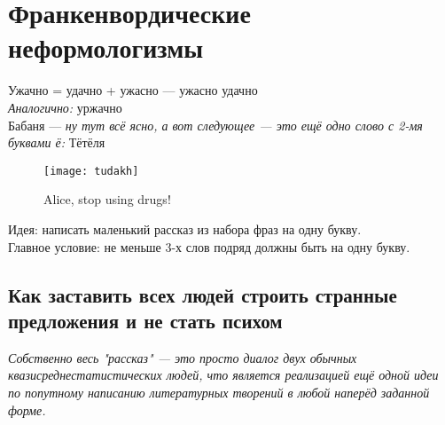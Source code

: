 \section{Франкенвордические неформологизмы}

Ужачно = удачно + ужасно --- ужасно удачно\\

\emph{Аналогично:} уржачно\\

Бабаня --- \emph{ну тут всё ясно, а вот следующее --- это ещё одно слово с 2-мя буквами ё:} Тётёля

\begin{figure}[ht!]
    \centering
    \texttt{[image: tudakh]}
    \caption{Alice, stop using drugs!}
\end{figure}

Идея: написать маленький рассказ из набора фраз на одну букву.\\
Главное условие: не меньше 3-х слов подряд должны быть на одну букву.

\subsection{Как заставить всех людей строить странные предложения и не стать психом}
\emph{Собственно весь "рассказ" --- это просто диалог двух обычных квазисреднестатистических людей, что является реализацией ещё одной идеи по попутному написанию литературных творений в любой наперёд заданной форме.}


